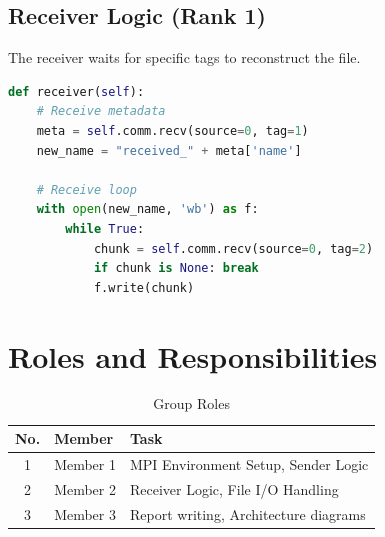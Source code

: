 \documentclass[a4paper,12pt]{article}
\begin{document}
\subsection{Receiver Logic (Rank 1)}
The receiver waits for specific tags to reconstruct the file.
\begin{lstlisting}[language=Python, caption=Receiver Function]
def receiver(self):
    # Receive metadata
    meta = self.comm.recv(source=0, tag=1)
    new_name = "received_" + meta['name']
    
    # Receive loop
    with open(new_name, 'wb') as f:
        while True:
            chunk = self.comm.recv(source=0, tag=2)
            if chunk is None: break
            f.write(chunk)
\end{lstlisting}

\section{Roles and Responsibilities}
\begin{table}[h]
\centering
\begin{tabular}{|c|l|l|}
\hline
\textbf{No.} & \textbf{Member} & \textbf{Task} \\ \hline
1 & Member 1 & MPI Environment Setup, Sender Logic \\ \hline
2 & Member 2 & Receiver Logic, File I/O Handling \\ \hline
3 & Member 3 & Report writing, Architecture diagrams \\ \hline
\end{tabular}
\caption{Group Roles}
\end{table}
\end{document}
